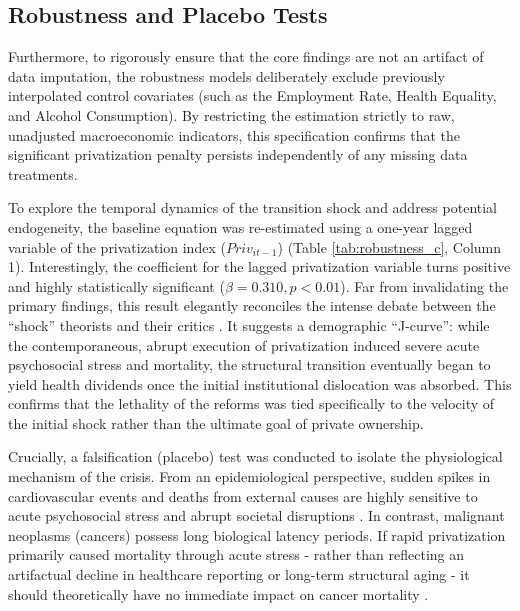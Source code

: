 \documentclass[en,magisterska]{pracamgr}
\begin{document}
\subsection{Robustness and Placebo Tests}

Furthermore, to rigorously ensure that the core findings are not an artifact of data imputation, the robustness models deliberately exclude previously interpolated control covariates (such as the Employment 
Rate, Health Equality, and Alcohol Consumption). By restricting the estimation strictly to raw, unadjusted macroeconomic indicators, this specification confirms that the significant privatization penalty 
persists independently of any missing data treatments.

To explore the temporal dynamics of the transition shock and address potential endogeneity, the baseline equation was re-estimated using a one-year lagged variable of the privatization index ($Priv_{it-1}$) 
(Table \ref{tab:robustness_c}, Column 1). Interestingly, the coefficient for the lagged privatization variable turns positive and highly statistically significant ($\beta = 0.310, p < 0.01$). Far from 
invalidating the primary findings, this result elegantly reconciles the intense debate between the ``shock'' theorists \citet{Stuckler2009} and their critics \citet{Earle2013}. It suggests a demographic 
``J-curve'': while the contemporaneous, abrupt execution of privatization induced severe acute psychosocial stress and mortality, the structural transition eventually began to yield health dividends once 
the initial institutional dislocation was absorbed. This confirms that the lethality of the reforms was tied specifically to the velocity of the initial shock rather than the ultimate goal of private ownership.

Crucially, a falsification (placebo) test was conducted to isolate the physiological mechanism of the crisis. From an epidemiological perspective, sudden spikes in cardiovascular events and deaths from 
external causes are highly sensitive to acute psychosocial stress and abrupt societal disruptions \citep{Leon1998, Brainerd2005}. In contrast, malignant neoplasms (cancers) possess long biological latency 
periods. If rapid privatization primarily caused mortality through acute stress  -  rather than reflecting an artifactual decline in healthcare reporting or long-term structural aging  -  it should theoretically 
have no immediate impact on cancer mortality \citep{Leon1997, Brainerd2005}.
\end{document}
